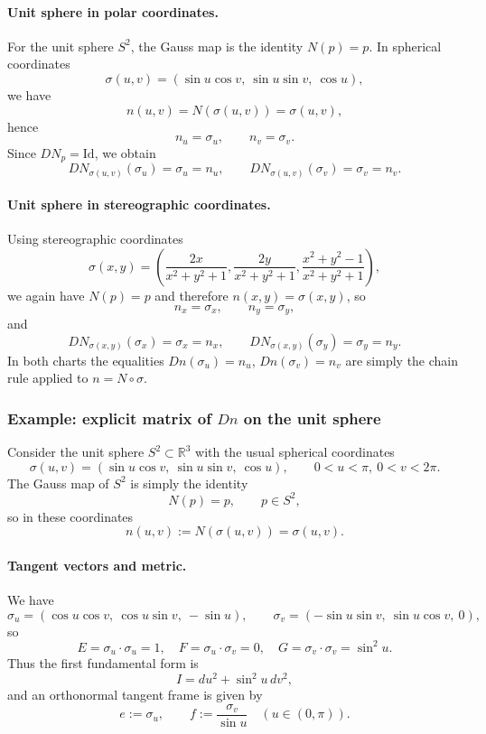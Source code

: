 \documentclass[12pt,a4paper]{article}
\theoremstyle{plain}
\theoremstyle{definition}      %
\begin{document}
\paragraph{Unit sphere in polar coordinates.}
For the unit sphere $S^2$, the Gauss map is the identity
$N(p)=p$.  In spherical coordinates
\[
\sigma(u,v) = (\sin u\cos v,\ \sin u\sin v,\ \cos u),
\]
we have
\[
n(u,v) = N(\sigma(u,v)) = \sigma(u,v),
\]
hence
\[
n_u = \sigma_u,\qquad n_v = \sigma_v.
\]
Since $DN_p = \mathrm{Id}$, we obtain
\[
DN_{\sigma(u,v)}(\sigma_u) = \sigma_u = n_u,\qquad
DN_{\sigma(u,v)}(\sigma_v) = \sigma_v = n_v.
\]

\paragraph{Unit sphere in stereographic coordinates.}
Using stereographic coordinates
\[
\sigma(x,y)
= \left(
\frac{2x}{x^2+y^2+1},
\frac{2y}{x^2+y^2+1},
\frac{x^2+y^2-1}{x^2+y^2+1}
\right),
\]
we again have $N(p)=p$ and therefore $n(x,y)=\sigma(x,y)$, so
\[
n_x = \sigma_x,\qquad n_y = \sigma_y,
\]
and
\[
DN_{\sigma(x,y)}(\sigma_x) = \sigma_x = n_x,\qquad
DN_{\sigma(x,y)}(\sigma_y) = \sigma_y = n_y.
\]
In both charts the equalities $Dn(\sigma_u)=n_u$, $Dn(\sigma_v)=n_v$ are
simply the chain rule applied to $n = N\circ\sigma$.

\subsubsection*{Example: explicit matrix of $Dn$ on the unit sphere}

Consider the unit sphere $S^{2}\subset\mathbb{R}^{3}$ with the usual spherical
coordinates
\[
\sigma(u,v) = (\sin u\cos v,\ \sin u\sin v,\ \cos u),
\qquad 0<u<\pi,\ 0<v<2\pi.
\]
The Gauss map of $S^{2}$ is simply the identity
\[
N(p)=p,\qquad p\in S^{2},
\]
so in these coordinates
\[
n(u,v) := N(\sigma(u,v)) = \sigma(u,v).
\]

\paragraph{Tangent vectors and metric.}
We have
\[
\sigma_{u} = (\cos u\cos v,\ \cos u\sin v,\ -\sin u),\qquad
\sigma_{v} = (-\sin u\sin v,\ \sin u\cos v,\ 0),
\]
so
\[
E = \sigma_{u}\cdot\sigma_{u} = 1,\quad
F = \sigma_{u}\cdot\sigma_{v} = 0,\quad
G = \sigma_{v}\cdot\sigma_{v} = \sin^{2}u.
\]
Thus the first fundamental form is
\[
I = du^{2} + \sin^{2}u\,dv^{2},
\]
and an orthonormal tangent frame is given by
\[
e := \sigma_{u},\qquad
f := \frac{\sigma_{v}}{\sin u}\quad (u\in(0,\pi)).
\]
\end{document}
